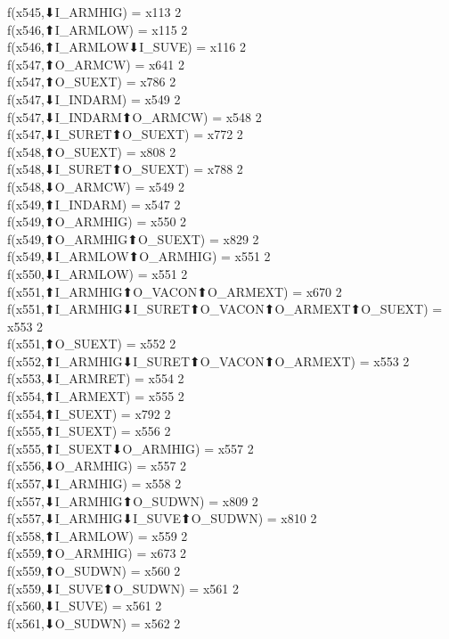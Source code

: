 f(x545,⬇I_ARMHIG) = x113 {2} \\
f(x546,⬆I_ARMLOW) = x115 {2} \\
f(x546,⬆I_ARMLOW⬇I_SUVE) = x116 {2} \\
f(x547,⬆O_ARMCW) = x641 {2} \\
f(x547,⬆O_SUEXT) = x786 {2} \\
f(x547,⬇I_INDARM) = x549 {2} \\
f(x547,⬇I_INDARM⬆O_ARMCW) = x548 {2} \\
f(x547,⬇I_SURET⬆O_SUEXT) = x772 {2} \\
f(x548,⬆O_SUEXT) = x808 {2} \\
f(x548,⬇I_SURET⬆O_SUEXT) = x788 {2} \\
f(x548,⬇O_ARMCW) = x549 {2} \\
f(x549,⬆I_INDARM) = x547 {2} \\
f(x549,⬆O_ARMHIG) = x550 {2} \\
f(x549,⬆O_ARMHIG⬆O_SUEXT) = x829 {2} \\
f(x549,⬇I_ARMLOW⬆O_ARMHIG) = x551 {2} \\
f(x550,⬇I_ARMLOW) = x551 {2} \\
f(x551,⬆I_ARMHIG⬆O_VACON⬆O_ARMEXT) = x670 {2} \\
f(x551,⬆I_ARMHIG⬇I_SURET⬆O_VACON⬆O_ARMEXT⬆O_SUEXT) = x553 {2} \\
f(x551,⬆O_SUEXT) = x552 {2} \\
f(x552,⬆I_ARMHIG⬇I_SURET⬆O_VACON⬆O_ARMEXT) = x553 {2} \\
f(x553,⬇I_ARMRET) = x554 {2} \\
f(x554,⬆I_ARMEXT) = x555 {2} \\
f(x554,⬆I_SUEXT) = x792 {2} \\
f(x555,⬆I_SUEXT) = x556 {2} \\
f(x555,⬆I_SUEXT⬇O_ARMHIG) = x557 {2} \\
f(x556,⬇O_ARMHIG) = x557 {2} \\
f(x557,⬇I_ARMHIG) = x558 {2} \\
f(x557,⬇I_ARMHIG⬆O_SUDWN) = x809 {2} \\
f(x557,⬇I_ARMHIG⬇I_SUVE⬆O_SUDWN) = x810 {2} \\
f(x558,⬆I_ARMLOW) = x559 {2} \\
f(x559,⬆O_ARMHIG) = x673 {2} \\
f(x559,⬆O_SUDWN) = x560 {2} \\
f(x559,⬇I_SUVE⬆O_SUDWN) = x561 {2} \\
f(x560,⬇I_SUVE) = x561 {2} \\
f(x561,⬇O_SUDWN) = x562 {2} \\

